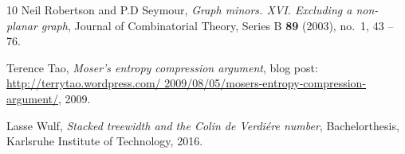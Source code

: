 \documentclass[11pt]{article}
\begin{document}
\begin{thebibliography}{10}
Neil Robertson and P.D Seymour, \emph{{G}raph minors. {XVI}. {E}xcluding a
  non-planar graph}, Journal of Combinatorial Theory, Series B \textbf{89}
  (2003), no.~1, 43 -- 76.

Terence Tao, \emph{Moser's entropy compression argument}, blog post:
  \href{http://terrytao.wordpress.com/2009/08/05/mosers-entropy-compression-argument/}{http://terrytao.wordpress.com/
  2009/08/05/mosers-entropy-compression-argument/}, 2009.

Lasse Wulf, \emph{Stacked treewidth and the {C}olin de {V}erdi\'{e}re number},
  Bachelorthesis, Karlsruhe Institute of Technology, 2016.

\end{thebibliography}
\end{document}
